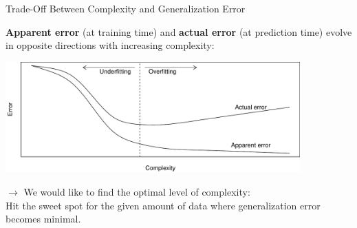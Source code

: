 \documentclass[11pt,compress,t,notes=noshow, xcolor=table]{beamer}
\newenvironment{knitrout}{}{} %
\begin{document}


\begin{vbframe}{Trade-Off Between Complexity and Generalization Error}

\textbf{Apparent error} (at training time) and \textbf{actual error} 
(at prediction time) evolve in opposite directions with increasing 
complexity:

\lz

\begin{knitrout}\scriptsize
{}\color{fgcolor}

{\centering \includegraphics[width=0.85\textwidth]{figure/eval_ofit_3} 
}
\end{knitrout}

\lz

$\rightarrow$ We would like to find the optimal level of complexity: \\ 
Hit the sweet spot  for the given amount of data where generalization error 
becomes minimal.

\end{vbframe}


\endlecture
\end{document}
